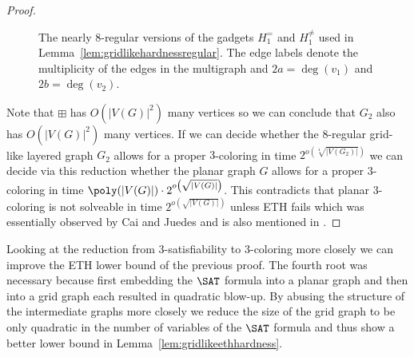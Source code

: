 \begin{proof}
\begin{figure}[tpb]
        \caption{The nearly $8$-regular versions of the gadgets $H^=_1$ and $H^{\neq}_1$ used in Lemma~\ref{lem:gridlikehardnessregular}.
        The edge labels denote the multiplicity of the edges in the multigraph and $2a = \deg(v_1)$ and $2b = \deg(v_2)$.}
        \label{fig:eqgadgetmult}
    \end{figure}

    Note that $\boxplus$ has $O(|V(G)|^2)$ many vertices so we can conclude that $G_2$ also has $O(|V(G)|^2)$ many vertices.
    If we can decide whether the $8$-regular grid-like layered graph $G_2$ allows for a proper $3$-coloring in time $2^{o\left(\sqrt[4]{|V(G_2)|}\right)}$ we can decide via this reduction whether the planar graph $G$ allows for a proper $3$-coloring in time $\poly(|V(G)|) \cdot 2^{o\left(\sqrt{|V(G)|}\right)}$.
    This contradicts that planar $3$-coloring is not solveable in time $2^{o\left(\sqrt{|V(G)|}\right)}$ unless ETH fails which was essentially observed by Cai and Juedes \cite{cai2001subexponential} and is also mentioned in \cite[Theorem 14.9]{cygan2015parameterized}.
\end{proof}

Looking at the reduction from $3$-satisfiability to $3$-coloring more closely we can improve the ETH lower bound of the previous proof.
The fourth root was necessary because first embedding the $\SAT$ formula into a planar graph and then into a grid graph each resulted in quadratic blow-up.
By abusing the structure of the intermediate graphs more closely we reduce the size of the grid graph to be only quadratic in the number of variables of the $\SAT$ formula and thus show a better lower bound in Lemma~\ref{lem:gridlikeethhardness}.

